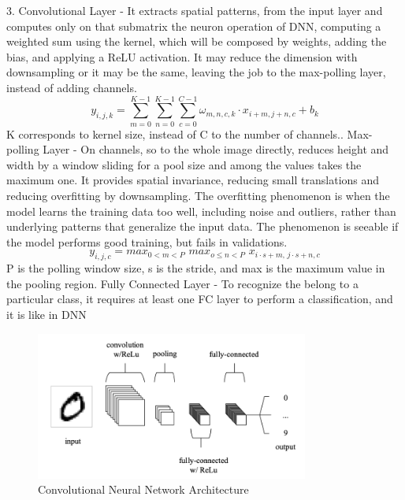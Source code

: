 3. Convolutional Layer - It extracts spatial patterns, from the input layer and computes only on that submatrix the neuron operation of DNN, computing a weighted sum using the kernel, which will be composed by weights, adding the bias, and applying a ReLU activation. It may reduce the dimension with downsampling or it may be the same, leaving the job to the max-polling layer, instead of adding channels.\newline
\begin{equation}
    y_{i,j,k}=\sum_{m=0}^{K-1}\sum_{n=0}^{K-1}\sum_{c=0}^{C-1}\omega_{m,n,c,k}\cdot x_{i+m,j+n,c}+b_k
\end{equation}
K corresponds to kernel size, instead of C to the number of channels.. Max-polling Layer - On channels, so to the whole image directly, reduces height and width by a window sliding for a pool size and among the values takes the maximum one. It provides spatial invariance, reducing small translations and reducing overfitting by downsampling. The overfitting phenomenon is when the model learns the training data too well, including noise and outliers, rather than underlying patterns that generalize the input data. The phenomenon is seeable if the model performs good training, but fails in validations.
\begin{equation}
    y_{i,j,c}=max_{0<m<P}\,\,max_{o\leq n<P}\,\,x_{i\cdot s+m,\,j\cdot s+n,c}
\end{equation}
P is the polling window size, s is the stride, and max is the maximum value in the pooling region. Fully Connected Layer - To recognize the belong to a particular class, it requires at least one FC layer to perform a classification, and it is like in DNN\newline 
\begin{center}
    \begin{figure}[!h]
        \centering
        \includegraphics[width=0.8\textwidth]{images/2.06 Convolutional Neural Network.png}
        \caption{Convolutional Neural Network Architecture}
    \end{figure}
\end{center}

